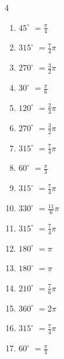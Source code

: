 \begin{multicols}{4}
\begin{enumerate}
  \item $\displaystyle 45^{\circ}$
        $\displaystyle =\frac{\pi}{4}$

  \item $\displaystyle 315^{\circ}$
        $\displaystyle =\frac{7}{4}\pi$

  \item $\displaystyle 270^{\circ}$
        $\displaystyle =\frac{3}{2}\pi$

  \item $\displaystyle 30^{\circ}$
        $\displaystyle =\frac{\pi}{6}$

  \item $\displaystyle 120^{\circ}$
        $\displaystyle =\frac{2}{3}\pi$

  \item $\displaystyle 270^{\circ}$
        $\displaystyle =\frac{3}{2}\pi$

  \item $\displaystyle 315^{\circ}$
        $\displaystyle =\frac{7}{4}\pi$

  \item $\displaystyle 60^{\circ}$
        $\displaystyle =\frac{\pi}{3}$

  \item $\displaystyle 315^{\circ}$
        $\displaystyle =\frac{7}{4}\pi$

  \item $\displaystyle 330^{\circ}$
        $\displaystyle =\frac{11}{6}\pi$

  \item $\displaystyle 315^{\circ}$
        $\displaystyle =\frac{7}{4}\pi$

  \item $\displaystyle 180^{\circ}$
        $\displaystyle =\pi$

  \item $\displaystyle 180^{\circ}$
        $\displaystyle =\pi$

  \item $\displaystyle 210^{\circ}$
        $\displaystyle =\frac{7}{6}\pi$

  \item $\displaystyle 360^{\circ}$
        $\displaystyle =2\pi$

  \item $\displaystyle 315^{\circ}$
        $\displaystyle =\frac{7}{4}\pi$

  \item $\displaystyle 60^{\circ}$
        $\displaystyle =\frac{\pi}{3}$


\end{enumerate}
\end{multicols}
